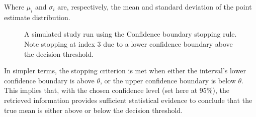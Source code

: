 \documentclass[sigconf,natbib=true,anonymous=true]{acmart}
\begin{document}
Where $\mu_i$ and $\sigma_i$ are, respectively, the mean and standard deviation of the point estimate distribution. 

\begin{figure}
    \centering
      
    \caption{A simulated study run using the Confidence boundary stopping rule. Note stopping at index 3 due to a lower confidence boundary above the decision threshold. }
    \label{fig:confidence_boundary}
\end{figure}


In simpler terms, the stopping criterion is met when either the interval's lower confidence boundary is above $\theta$, or the upper confidence boundary is below  $\theta$. This implies that, with the chosen confidence level (set here at 95\%), the retrieved information provides sufficient statistical evidence to conclude that the true mean is either above or below the decision threshold.



\end{document}
